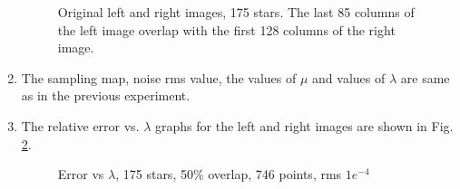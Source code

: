 \begin{enumerate}
\begin{figure}[t!]
{		}
\caption [Original images, 175 stars, 50\% overlap]{Original left and right images, 175 stars. The last 85 columns of the left image overlap with the first 128 columns of the right image.}
\label{fig:expt21}
\end{figure}
\item The sampling map, noise rms value, the values of $\mu$ and values of $\lambda$ are same as in the previous experiment.
\item The relative error vs.  $\lambda$ graphs for the left and right images are shown in Fig. \ref{fig:expt22}.

\begin{figure}[b!]

\hspace{-0.1in}
\caption [Error vs $\lambda$, 175 stars, 50\% overlap, 746 points,  rms $1e^{-4}$]{Error vs $\lambda$, 175 stars, 50\% overlap, 746 points, rms $1e^{-4}$}
\label{fig:expt22}
\end{figure}


\end{enumerate}
